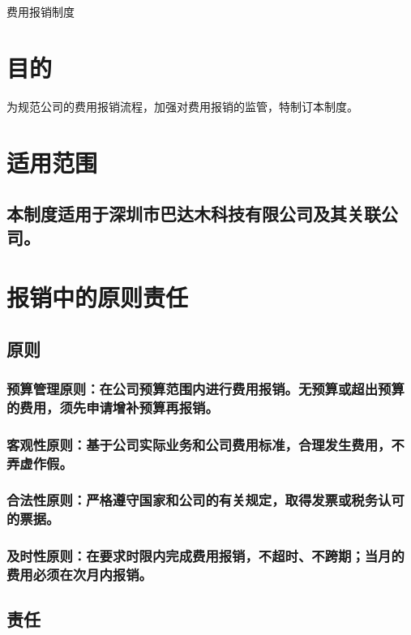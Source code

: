 \documentclass[]{article}
\begin{document}
\thispagestyle{empty}
\begin{center}
费用报销制度
\end{center}

\section{目的}

为规范公司的费用报销流程，加强对费用报销的监管，特制订本制度。

\nopagebreak[4]
\section{适用范围}
\subsection{本制度适用于深圳市巴达木科技有限公司及其关联公司。}

\section{报销中的原则责任}
\subsection{原则}
\subsubsection{预算管理原则：在公司预算范围内进行费用报销。无预算或超出预算的费用，须先申请增补预算再报销。}
\subsubsection{客观性原则：基于公司实际业务和公司费用标准，合理发生费用，不弄虚作假。}
\subsubsection{合法性原则：严格遵守国家和公司的有关规定，取得发票或税务认可的票据。}
\subsubsection{及时性原则：在要求时限内完成费用报销，不超时、不跨期；当月的费用必须在次月内报销。}
\subsection{责任}
\end{document}
